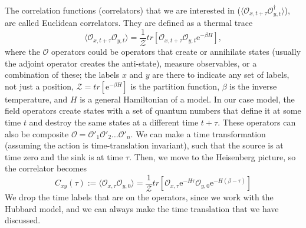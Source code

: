 The correlation functions (correlators) that we are interested in ($\langle \mathcal{O}_{x,t+\tau}\mathcal{O}^\dagger_{y,t} \rangle$), are called Euclidean correlators. They are defined as a thermal trace
\begin{equation}
    \langle \mathcal{O}_{x,t+\tau}\mathcal{O}_{y,t} \rangle = \frac{1}{\mathcal{Z}}tr\left[ \mathcal{O}_{x,t+\tau}\mathcal{O}_{y,t}\mathrm{e}^{-\beta H} \right],
\end{equation}
where the $\mathcal{O}$ operators could be operators that create or annihilate states (usually the adjoint operator creates the anti-state), measure observables, or a combination of these; the labels $x$ and $y$ are there to indicate any set of labels, not just a position, $\mathcal{Z} = tr\left[ \mathrm{e}^{-\beta H} \right]$ is the partition function, $\beta$ is the inverse temperature, and $H$ is a general Hamiltonian of a model. In our case model, the field operators create states with a set of quantum numbers that define it at some time $t$ and destroy the same states at a different time $t + \tau$. These operators can also be composite $\mathcal{O} = \mathcal{O'}_1\mathcal{O'}_2\hdots\mathcal{O'}_n$. We can make a time transformation (assuming the action is time-translation invariant), such that the source is at time zero and the sink is at time $\tau$. Then, we move to the Heisenberg picture, so the correlator becomes
\begin{equation}
    C_{xy}(\tau) := \langle \mathcal{O}_{x,\tau}\mathcal{O}_{y,0} \rangle = \frac{1}{\mathcal{Z}}tr\left[ \mathcal{O}_{x,\tau}\mathrm{e}^{-H\tau}\mathcal{O}_{y,0}\mathrm{e}^{-H(\beta - \tau)} \right]
\end{equation}
We drop the time labels that are on the operators, since we work with the Hubbard model, and we can always make the time translation that we have discussed.

